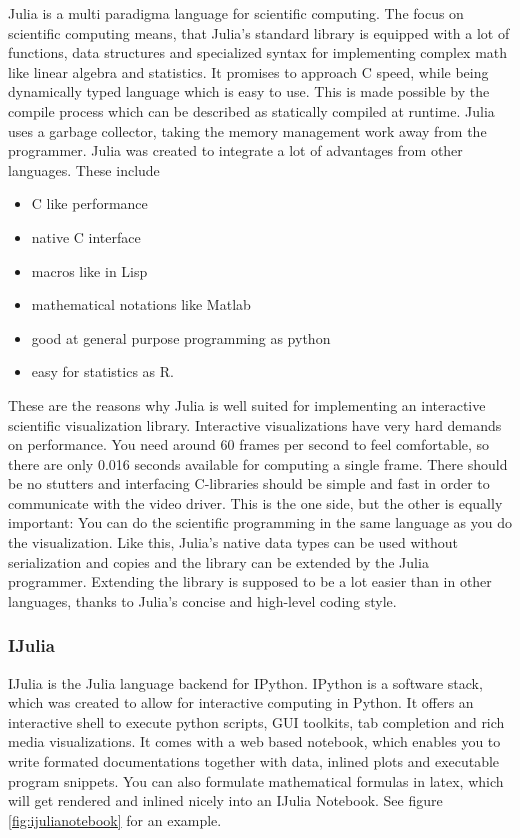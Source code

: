 Julia is a multi paradigma language for scientific computing.
The focus on scientific computing means, that Julia's standard library is equipped with a lot of functions, data structures and specialized syntax for implementing complex math like linear algebra and statistics.
It promises to approach C speed, while being dynamically typed language which is easy to use.
This is made possible by the compile process which can be described as statically compiled at runtime.
Julia uses a garbage collector, taking the memory management work away from the programmer.
Julia was created to integrate a lot of advantages from other languages.
These include \cite{WhyJulia}
\begin{itemize}
	\item C like performance
	\item native C interface
	\item macros like in Lisp
	\item mathematical notations like Matlab
	\item good at general purpose programming as python
	\item easy for statistics as R.
\end{itemize}
These are the reasons why Julia is well suited for implementing an interactive scientific visualization library.
Interactive visualizations have very hard demands on performance. 
You need around 60 frames per second to feel comfortable, so there are only 0.016 seconds available for computing a single frame.
There should be no stutters and interfacing C-libraries should be simple and fast in order to communicate with the video driver.
This is the one side, but the other is equally important:
You can do the scientific programming in the same language as you do the visualization.
Like this, Julia's native data types can be used without serialization and copies and the library can be extended by the Julia programmer.
Extending the library is supposed to be a lot easier than in other languages, thanks to Julia's concise and high-level coding style.


\subsubsection{IJulia}
IJulia is the Julia language backend for IPython.
IPython is a software stack, which was created to allow for interactive computing in Python.
It offers an interactive shell to execute python scripts, \ac{GUI} toolkits, tab completion and rich media visualizations.
It comes with a web based notebook, which enables you to write formated documentations together with data, inlined plots and executable program snippets. You can also formulate mathematical formulas in latex, which will get rendered and inlined nicely into an IJulia Notebook.
See figure \ref{fig:ijulianotebook} for an example.

